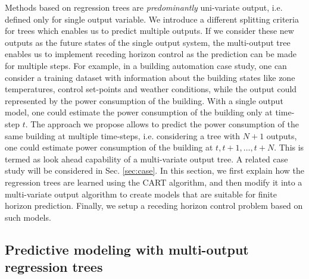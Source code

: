 Methods based on regression trees are \emph{predominantly} uni-variate output, i.e. defined only for single output variable. 
We introduce a different splitting criteria for trees which enables us to predict multiple outputs. 
If we consider these new outputs as the future states of the single output system, the multi-output tree enables us to implement receding horizon control as the prediction can be made for multiple steps. 
For example, in a building automation case study, one can consider a training dataset with information about the building states like zone temperatures, control set-points and weather conditions, while the output could represented by the power consumption of the building. 
With a single output model, one could estimate the power consumption of the building only at time-step $t$. 
The approach we propose allows to predict the power consumption of the same building at multiple time-steps, i.e. considering a tree with $N+1$ outputs, one could estimate power consumption of the building at $t, t+1,\ldots,t+N$. 
This is termed as look ahead capability of a multi-variate output tree. 
A related case study will be considered in Sec. \ref{sec:case}. 
In this section, we first explain how the regression trees are learned using the CART algorithm, and then modify it into a multi-variate output algorithm to create models that are suitable for finite horizon prediction. 
Finally, we setup a receding horizon control problem based on such models.

\subsection{Predictive modeling with multi-output regression trees}
\label{SS:training_algo}

